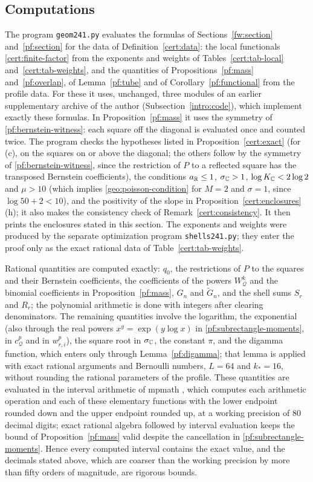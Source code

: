 \subsection{Computations}\label{cert:computations}
The program \texttt{geom241.py} evaluates the formulas of
Sections~\ref{fw:section} and~\ref{pf:section} for the data of
Definition~\ref{cert:data}: the local functionals
\eqref{cert:finite-factor} from the exponents and weights of
Tables~\ref{cert:tab-local} and~\ref{cert:tab-weights}, and the
quantities of Propositions~\ref{pf:mass} and~\ref{pf:overlap}, of
Lemma~\ref{pf:tube} and of Corollary~\ref{pf:functional} from the
profile data. For these it uses, unchanged, three modules of an earlier
supplementary archive of the author (Subsection~\ref{intro:code}), which
implement exactly these formulas. In Proposition~\ref{pf:mass} it uses
the symmetry of \eqref{pf:bernstein-witness}: each square off the
diagonal is evaluated once and counted twice. The program checks the
hypotheses listed in Proposition~\ref{cert:exact} (for (c), on the
squares on or above the diagonal; the others follow by the symmetry of
\eqref{pf:bernstein-witness}, since the restriction of $P$ to a reflected
square has the transposed Bernstein coefficients), the conditions
$a_\mathbb R\le1$, $\sigma_\mathbb C>1$, $\log K_\mathbb C<2\log2$ and $\mu>10$ (which
implies \eqref{geo:poisson-condition} for $M=2$ and $\sigma=1$, since
$\log50+2<10$), and the positivity of the slope in
Proposition~\ref{cert:enclosures}(h); it also makes the consistency
check of Remark~\ref{cert:consistency}. It then prints the enclosures
stated in this section. The exponents and weights were produced by the
separate optimization program \texttt{shells241.py}; they enter the
proof only as the exact rational data of Table~\ref{cert:tab-weights}.

Rational quantities are computed exactly: $q_0$, the restrictions of
$P$ to the squares and their Bernstein coefficients, the coefficients
of the powers $W_{\mathcal Q}^k$ and the binomial coefficients in
Proposition~\ref{pf:mass}, $G_n$ and $\widetilde G_n$, and the shell
sums $S_r$ and $R_r$; the polynomial arithmetic is done with integers
after clearing denominators. The remaining quantities involve the
logarithm, the exponential (also through the real powers
$x^y=\exp(y\log x)$ in \eqref{pf:subrectangle-moments}, in
$c_{\mathcal Q}^p$ and in $w_{r,i}^p$), the square root in $\sigma_\mathbb C$,
the constant $\pi$, and the digamma function, which enters only through
Lemma~\ref{pf:digamma}; that lemma is applied with exact rational
arguments and Bernoulli numbers, $L=64$ and $k_*=16$, without rounding
the rational parameters of the profile. These quantities are evaluated
in the interval arithmetic of mpmath \cite{Mpmath}, which computes each
arithmetic operation and each of these elementary functions with the
lower endpoint rounded down and the upper endpoint rounded up, at a
working precision of $80$ decimal digits; exact rational algebra
followed by interval evaluation keeps the bound of
Proposition~\ref{pf:mass} valid despite the cancellation in
\eqref{pf:subrectangle-moments}. Hence every computed interval contains
the exact value, and the decimals stated above, which are coarser than
the working precision by more than fifty orders of magnitude, are
rigorous bounds.
